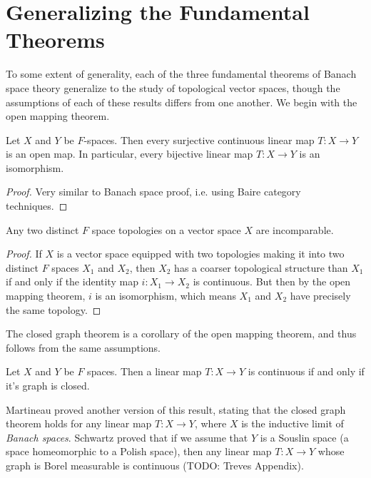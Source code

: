\section{Generalizing the Fundamental Theorems}

To some extent of generality, each of the three fundamental theorems of Banach space theory generalize to the study of topological vector spaces, though the assumptions of each of these results differs from one another. We begin with the open mapping theorem.

\begin{theorem}
    Let $X$ and $Y$ be $F$-spaces. Then every surjective continuous linear map $T: X \to Y$ is an open map. In particular, every bijective linear map $T: X \to Y$ is an isomorphism.
\end{theorem}
\begin{proof}
    Very similar to Banach space proof, i.e. using Baire category techniques.
\end{proof}

\begin{corollary}
    Any two distinct $F$ space topologies on a vector space $X$ are incomparable.
\end{corollary}
\begin{proof}
    If $X$ is a vector space equipped with two topologies making it into two distinct $F$ spaces $X_1$ and $X_2$, then $X_2$ has a coarser topological structure than $X_1$ if and only if the identity map $i: X_1 \to X_2$ is continuous. But then by the open mapping theorem, $i$ is an isomorphism, which means $X_1$ and $X_2$ have precisely the same topology.
\end{proof}

The closed graph theorem is a corollary of the open mapping theorem, and thus follows from the same assumptions.

\begin{theorem}
    Let $X$ and $Y$ be $F$ spaces. Then a linear map $T: X \to Y$ is continuous if and only if it's graph is closed.
\end{theorem}

\begin{remark}
    Martineau proved another version of this result, stating that the closed graph theorem holds for any linear map $T:X \to Y$, where $X$ is the inductive limit of \emph{Banach spaces}. Schwartz proved that if we assume that $Y$ is a Souslin space (a space homeomorphic to a Polish space), then any linear map $T: X \to Y$ whose graph is Borel measurable is continuous (TODO: Treves Appendix).
\end{remark}


